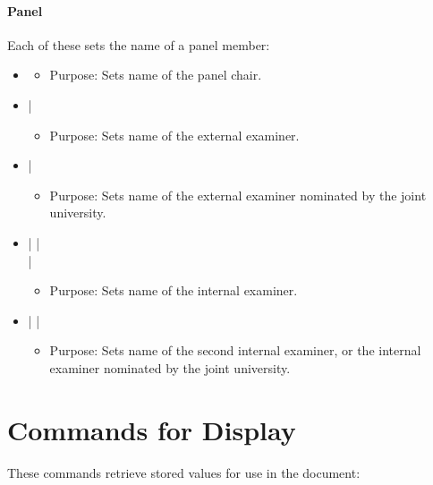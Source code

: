 \paragraph{Panel}
Each of these sets the name of a panel member:
\begin{itemize}[noitemsep]
\item {}
\begin{itemize}[noitemsep]
  \item \textsf{Purpose:} Sets name of the panel chair.
\end{itemize}
\item {} | 
\begin{itemize}[noitemsep]
  \item \textsf{Purpose:} Sets name of the external examiner.
\end{itemize}
\item {} | 
\begin{itemize}[noitemsep]
  \item \textsf{Purpose:} Sets name of the external examiner nominated by the joint university.
\end{itemize}
\item {} |  | \\
 | 
\begin{itemize}[noitemsep]
  \item \textsf{Purpose:} Sets name of the internal examiner.
\end{itemize}
\item {} |  | \\
\begin{itemize}[noitemsep]
  \item \textsf{Purpose:} Sets name of the second internal examiner, or the internal examiner nominated by the joint university.
\end{itemize}
\end{itemize}

\section{Commands for Display}

These commands retrieve stored values for use in the document:


